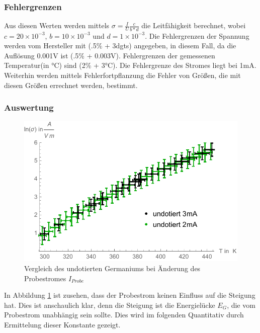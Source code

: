 \subsubsection{Fehlergrenzen}
Aus diesen Werten werden mittels $\sigma=\frac{I}{U}\frac{c}{b *d}$ die Leitfähigkeit berechnet, wobei $c=20 \times 10^{-3}$, $b=10 \times 10^{-3}$ und $d=1 \times 10^{-3}$. Die Fehlergrenzen der Spannung werden vom Hersteller mit (.5\% + 3dgts) angegeben, in diesem Fall, da die Auflösung 0.001V ist (.5\% + 0.003V). Fehlergrenzen der gemessenen Temperatur(in °C) sind (2\% + 3°C). Die Fehlergrenze des Stromes liegt bei 1mA. Weiterhin werden mittels Fehlerfortpflanzung die Fehler von Größen, die mit diesen Größen errechnet werden, bestimmt.\\

\subsubsection{Auswertung}
\begin{figure}[H]
	\centering
\includegraphics[width=0.9\linewidth]{IMAGE/M2_Stromvergleich.pdf}
	\caption{Vergleich des undotierten Germaniums bei Änderung des Probestromes $I_{Probe}$}
	\label{fig:M2_4}
\end{figure} 

In Abbildung \ref{fig:M2_4} ist zusehen, dass der Probestrom keinen Einfluss auf die Steigung hat. Dies ist anschaulich klar, denn die Steigung ist die Energielücke $E_{G}$, die vom Probestrom unabhängig sein sollte. Dies wird im folgenden Quantitativ durch Ermittelung dieser Konstante gezeigt.\\

